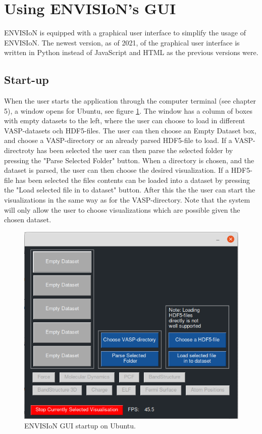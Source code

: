 \section{Using ENVISIoN's GUI}
\label{sec:newGUI}
ENVISIoN is equipped with a graphical user interface to simplify the usage of ENVISIoN. The newest version, as of 2021, of the graphical user interface is written in Python instead of JavaScript and HTML as the previous versions were. 

\subsection{Start-up}
When the user starts the application through the computer terminal (see chapter 5), a window opens for Ubuntu, see figure \ref{fig:newGUI}. The window has a column of boxes with empty datasets to the left, where the user can choose to load in different VASP-datasets och HDF5-files. The user can then choose an Empty Dataset box, and choose a VASP-directory or an already parsed HDF5-file to load. If a VASP-directroty has been selected the user can then parse the selected folder by pressing the "Parse Selected Folder" button. When a directory is chosen, and the dataset is parsed, the user can then choose the desired visualization. If a HDF5-file has been selected the files contents can be loaded into a dataset by pressing the "Load selected file in to dataset" button. After this the the user can start the visualizations in the same way as for the VASP-directory. Note that the system will only allow the user to choose visualizations which are possible given the chosen dataset. 

\begin{figure}[H]
    \centering
    \includegraphics[scale = 0.56]{Images/newGUI.png}
    \caption{ENVISIoN GUI startup on Ubuntu.}
    \label{fig:newGUI}
\end{figure}

